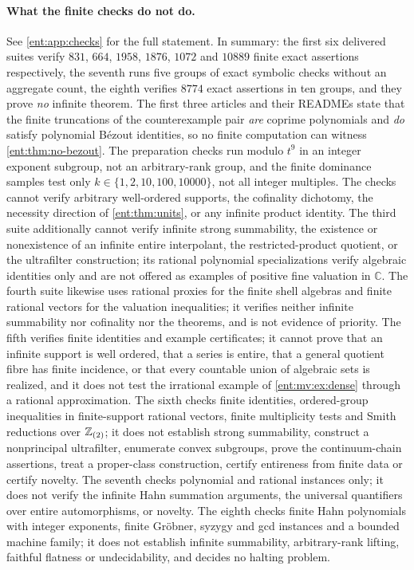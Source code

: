 \documentclass[11pt]{article}
\theoremstyle{plain}
\theoremstyle{plain}
\theoremstyle{plain}
\theoremstyle{definition}
\theoremstyle{definition}
\theoremstyle{definition}
\theoremstyle{definition}
\theoremstyle{remark}
\newcommand{\C}{\mathbb C}\newcommand{\R}{\mathbb R}
\begin{document}
\paragraph{What the finite checks do not do.}
See \cref{ent:app:checks} for the full statement. In summary: the first six
delivered suites verify $831$, $664$, $1958$, $1876$, $1072$ and $10889$
finite exact assertions respectively, the seventh runs five groups of exact
symbolic checks without an aggregate count, the eighth verifies $8774$ exact
assertions in ten groups, and they prove \emph{no} infinite
theorem. The first
three articles and their READMEs state that the finite truncations of the
counterexample pair \emph{are} coprime polynomials and \emph{do} satisfy
polynomial B\'ezout identities, so no finite computation can witness
\cref{ent:thm:no-bezout}. The preparation checks run modulo $t^9$ in an
integer exponent subgroup, not an arbitrary-rank group, and the finite
dominance samples test only $k\in\{1,2,10,100,10000\}$, not all integer
multiples. The checks cannot verify arbitrary well-ordered supports, the
cofinality dichotomy, the necessity direction of \cref{ent:thm:units}, or any
infinite product identity. The third suite additionally cannot verify
infinite strong summability, the existence or nonexistence of an infinite
entire interpolant, the restricted-product quotient, or the ultrafilter
construction; its rational polynomial specializations verify algebraic
identities only and are not offered as examples of positive fine valuation in
$\C$. The fourth suite likewise uses rational proxies for the finite shell
algebras and finite rational vectors for the valuation inequalities; it
verifies neither infinite summability nor cofinality nor the theorems, and
is not evidence of priority. The fifth verifies finite identities and
example certificates; it cannot prove that an infinite support is well
ordered, that a series is entire, that a general quotient fibre has finite
incidence, or that every countable union of algebraic sets is realized, and
it does not test the irrational example of \cref{ent:mv:ex:dense} through a
rational approximation. The sixth checks finite identities, ordered-group
inequalities in finite-support rational vectors, finite multiplicity tests
and Smith reductions over $\mathbb Z_{(2)}$; it does not establish strong
summability, construct a nonprincipal ultrafilter, enumerate convex
subgroups, prove the continuum-chain assertions, treat a proper-class
construction, certify entireness from finite data or certify novelty. The
seventh checks polynomial and rational instances only; it does not verify the
infinite Hahn summation arguments, the universal quantifiers over entire
automorphisms, or novelty. The
eighth checks finite Hahn polynomials with integer exponents, finite
Gr\"obner, syzygy and gcd instances and a bounded machine family; it does not
establish infinite summability, arbitrary-rank lifting, faithful flatness or
undecidability, and decides no halting problem.
\end{document}
